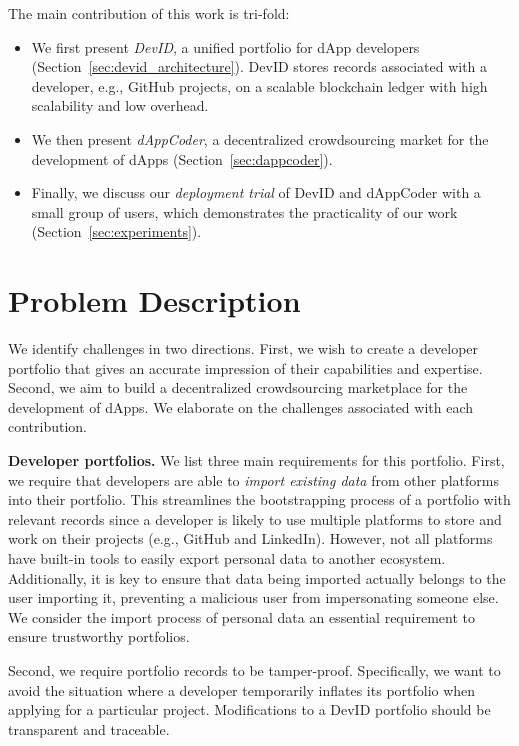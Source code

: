 The main contribution of this work is tri-fold:
\begin{itemize}
	\item We first present \emph{DevID}, a unified portfolio for dApp developers (Section~\ref{sec:devid_architecture}). DevID stores records associated with a developer, e.g., GitHub projects, on a scalable blockchain ledger with high scalability and low overhead.
	\item We then present \emph{dAppCoder}, a decentralized crowdsourcing market for the development of dApps (Section~\ref{sec:dappcoder}).
	\item Finally, we discuss our \emph{deployment trial} of DevID and dAppCoder with a small group of users, which demonstrates the practicality of our work (Section~\ref{sec:experiments}).
\end{itemize}

\section{Problem Description}
\label{sec:dappcoder_problem_description}
We identify challenges in two directions.
First, we wish to create a developer portfolio that gives an accurate impression of their capabilities and expertise.
Second, we aim to build a decentralized crowdsourcing marketplace for the development of dApps.
We elaborate on the challenges associated with each contribution.

\textbf{Developer portfolios.}
We list three main requirements for this portfolio.
First, we require that developers are able to \emph{import existing data} from other platforms into their portfolio.
This streamlines the bootstrapping process of a portfolio with relevant records since a developer is likely to use multiple platforms to store and work on their projects (e.g., GitHub and LinkedIn).
However, not all platforms have built-in tools to easily export personal data to another ecosystem.
Additionally, it is key to ensure that data being imported actually belongs to the user importing it, preventing a malicious user from impersonating someone else.
We consider the import process of personal data an essential requirement to ensure trustworthy portfolios.

Second, we require portfolio records to be tamper-proof.
Specifically, we want to avoid the situation where a developer temporarily inflates its portfolio when applying for a particular project.
Modifications to a DevID portfolio should be transparent and traceable.

